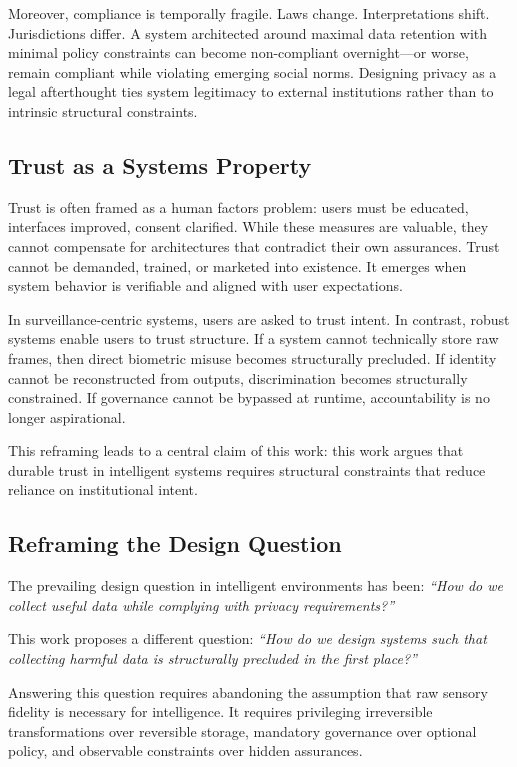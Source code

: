 \documentclass[conference]{IEEEtran}
\begin{document}
Moreover, compliance is temporally fragile. Laws change. Interpretations shift. Jurisdictions differ. A system architected around maximal data retention with minimal policy constraints can become non-compliant overnight---or worse, remain compliant while violating emerging social norms. Designing privacy as a legal afterthought ties system legitimacy to external institutions rather than to intrinsic structural constraints.

\subsection{Trust as a Systems Property}
Trust is often framed as a human factors problem: users must be educated, interfaces improved, consent clarified. While these measures are valuable, they cannot compensate for architectures that contradict their own assurances. Trust cannot be demanded, trained, or marketed into existence. It emerges when system behavior is verifiable and aligned with user expectations.

In surveillance-centric systems, users are asked to trust intent. In contrast, robust systems enable users to trust structure. If a system cannot technically store raw frames, then direct biometric misuse becomes structurally precluded. If identity cannot be reconstructed from outputs, discrimination becomes structurally constrained. If governance cannot be bypassed at runtime, accountability is no longer aspirational.

This reframing leads to a central claim of this work: this work argues that durable trust in intelligent systems requires structural constraints that reduce reliance on institutional intent.

\subsection{Reframing the Design Question}
The prevailing design question in intelligent environments has been:
\textit{``How do we collect useful data while complying with privacy requirements?''}

This work proposes a different question:
\textit{``How do we design systems such that collecting harmful data is structurally precluded in the first place?''}

Answering this question requires abandoning the assumption that raw sensory fidelity is necessary for intelligence. It requires privileging irreversible transformations over reversible storage, mandatory governance over optional policy, and observable constraints over hidden assurances.
\end{document}
